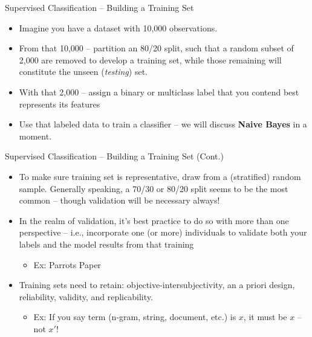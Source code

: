 \documentclass[
  ignorenonframetext,
  aspectratio=169]{beamer}
\begin{document}
\begin{frame}{Supervised Classification -- Building a Training Set}
\label{supervised-classification-building-a-training-set}
\begin{itemize}
  \item Imagine you have a dataset with 10,000 observations. \par \vspace{2.5mm}
  \item From that 10,000 -- partition an 80/20 split, such that a random subset of 2,000 are removed to develop a training set, while those remaining will constitute the unseen (\textit{testing}) set.  \par \vspace{2.5mm}
  \item With that 2,000 -- assign a binary or multiclass label that you contend best represents its features \par \vspace{2.5mm}
  \item Use that labeled data to train a classifier -- we will discuss \textbf{Naive Bayes} in a moment. 
\end{itemize}
\end{frame}

\begin{frame}{Supervised Classification -- Building a Training Set
(Cont.)}
\label{supervised-classification-building-a-training-set-cont.}
\begin{itemize}
\item To make sure training set is representative, draw from a (stratified) random sample. Generally speaking, a 70/30 or 80/20 split seems to be the most common -- though validation will be necessary always! \par \vspace{2.5mm} \pause
\item In the realm of validation, it's best practice to do so with more than one perspective -- i.e., incorporate one (or more) individuals to validate both your labels and the model results from that training 
  \begin{itemize}
  \item[] Ex: Parrots Paper
  \end{itemize} \par \vspace{2.5mm} \pause
\item Training sets need to retain: objective-intersubjectivity, an a priori design, reliability, validity, and replicability.
\begin{itemize}
  \item[] Ex: If you say term (n-gram, string, document, etc.) is $x$, it must be $x$ -- not $x'$!
  \end{itemize} 
\end{itemize}
\end{frame}
\end{document}
